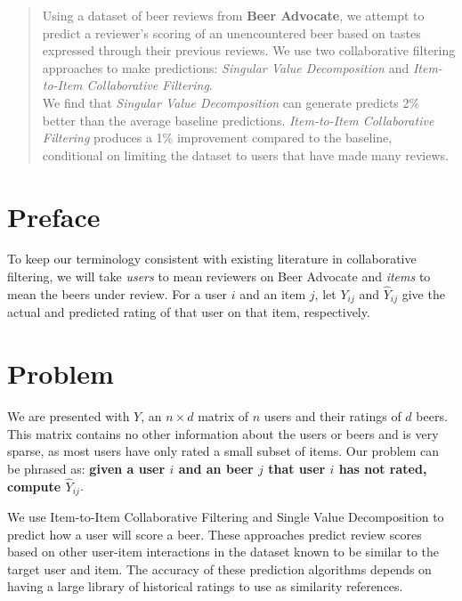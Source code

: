 \documentclass[12pt]{article}
\begin{document}
\maketitle
\begin{abstract}
Using a dataset of beer reviews from \textbf{Beer Advocate}, we attempt to predict a reviewer's scoring of an unencountered beer based on tastes expressed through their previous reviews. We use two collaborative filtering approaches to make predictions: \textit{Singular Value Decomposition} and \textit{Item-to-Item Collaborative Filtering}. \\

We find that \textit{Singular Value Decomposition} can generate predicts 2\% better than the average baseline predictions. \textit{Item-to-Item Collaborative Filtering} produces a 1\% improvement compared to the baseline, conditional on limiting the dataset to users that have made many reviews. \\
\end{abstract}

\section{Preface}
To keep our terminology consistent with existing literature in collaborative filtering, we will take \textit{users} to mean reviewers on Beer Advocate and \textit{items} to mean the beers under review. For a user $i$ and an item $j$, let $Y_{ij}$ and $\hat Y_{ij}$ give the actual and predicted rating of that user on that item, respectively.

\section{Problem}
We are presented with $Y$, an $n \times d$ matrix of $n$ users and their ratings of $d$ beers. This matrix contains no other information about the users or beers and is very sparse, as most users have only rated a small subset of items. Our problem can be phrased as: \textbf{given a user $i$ and an beer $j$ that user $i$ has not rated, compute $\hat Y_{ij}$}.

We use Item-to-Item Collaborative Filtering and Single Value Decomposition to predict how a user will score a beer. These approaches predict review scores based on other user-item interactions in the dataset known to be similar to the target user and item. The accuracy of these prediction algorithms depends on having a large library of historical ratings to use as similarity references.\textsuperscript{\cite{sarwar}}
\end{document}
